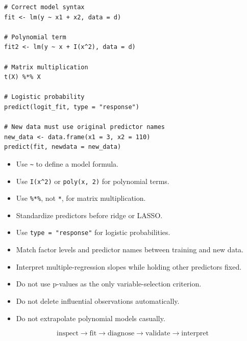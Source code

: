 \documentclass[11pt]{article}
\begin{document}
\begin{lstlisting}
# Correct model syntax
fit <- lm(y ~ x1 + x2, data = d)

# Polynomial term
fit2 <- lm(y ~ x + I(x^2), data = d)

# Matrix multiplication
t(X) %*% X

# Logistic probability
predict(logit_fit, type = "response")

# New data must use original predictor names
new_data <- data.frame(x1 = 3, x2 = 110)
predict(fit, newdata = new_data)
\end{lstlisting}

\begin{itemize}[leftmargin=*]
\item Use \texttt{\textasciitilde{}} to define a model formula.
\item Use \texttt{I(x\textasciicircum2)} or \texttt{poly(x, 2)} for polynomial terms.
\item Use \texttt{\%*\%}, not \texttt{*}, for matrix multiplication.
\item Standardize predictors before ridge or LASSO.
\item Use \texttt{type = "response"} for logistic probabilities.
\item Match factor levels and predictor names between training and new data.
\item Interpret multiple-regression slopes while holding other predictors fixed.
\item Do not use p-values as the only variable-selection criterion.
\item Do not delete influential observations automatically.
\item Do not extrapolate polynomial models casually.
\end{itemize}

\[
\boxed{\text{inspect} \longrightarrow \text{fit} \longrightarrow
\text{diagnose} \longrightarrow \text{validate} \longrightarrow
\text{interpret}}
\]
\end{document}
